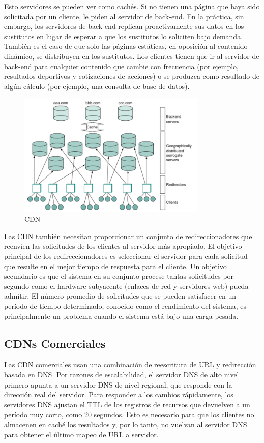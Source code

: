 Esto servidores se pueden ver como cachés. Si no tienen una página que haya sido solicitada por un cliente, le piden al servidor de back-end. En la práctica, sin embargo, los servidores de back-end replican proactivamente sus datos en los sustitutos en lugar de esperar a que los sustitutos lo soliciten bajo demanda. También es el caso de que solo las páginas estáticas, en oposición al contenido dinámico, se distribuyen en los sustitutos. Los clientes tienen que ir al servidor de back-end para cualquier contenido que cambie con frecuencia (por ejemplo, resultados deportivos y cotizaciones de acciones) o se produzca como resultado de algún cálculo (por ejemplo, una consulta de base de datos).

\begin{figure}[H]
	\centering
	\includegraphics[width=0.8\textwidth
]{images/cdn-distribution.png}
	\caption[CDN]{CDN}
	\label{fig:cdn-distribution}
\end{figure}
Las CDN también necesitan proporcionar un conjunto de redireccionadores que reenvíen las solicitudes de los clientes al servidor más apropiado. El objetivo principal de los redireccionadores es seleccionar el servidor para cada solicitud que resulte en el mejor tiempo de respuesta para el cliente. Un objetivo secundario es que el sistema en su conjunto procese tantas solicitudes por segundo como el hardware subyacente (enlaces de red y servidores web) pueda admitir. El número promedio de solicitudes que se pueden satisfacer en un período de tiempo determinado, conocido como el rendimiento del sistema, es principalmente un problema cuando el sistema está bajo una carga pesada.

\subsection{CDNs Comerciales}
Las CDN comerciales usan una combinación de reescritura de URL y redirección basada en DNS. Por razones de escalabilidad, el servidor DNS de alto nivel primero apunta a un servidor DNS de nivel regional, que responde con la dirección real del servidor. Para responder a los cambios rápidamente, los servidores DNS ajustan el TTL de los registros de recursos que devuelven a un período muy corto, como 20 segundos. Esto es necesario para que los clientes no almacenen en caché los resultados y, por lo tanto, no vuelvan al servidor DNS para obtener el último mapeo de URL a servidor.
